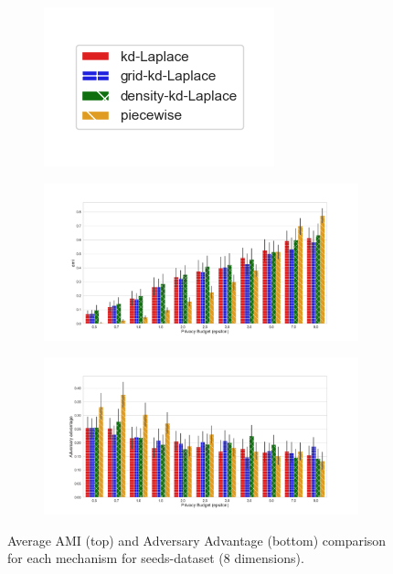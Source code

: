 \begin{figure}[H]
    \centering
    \begin{subfigure}{0.30\textwidth}
        \includegraphics[width=\textwidth]{Results/kd-laplace/ami_bar_comparison_legend.png}
    \end{subfigure}
    \begin{subfigure}{1\textwidth}
        \includegraphics[width=1\textwidth]{Results/kd-laplace/ami_seeds-dataset_comparison.png}
    \end{subfigure}
    \begin{subfigure}{1\textwidth}
        \includegraphics[width=1\textwidth]{Results/kd-laplace/shokri_mi_adv_seeds-dataset_comparison.png}
    \end{subfigure}
    \caption{Average AMI (top) and Adversary Advantage (bottom) comparison for each mechanism for seeds-dataset (8 dimensions).}
    \label{fig:utility_seeds-dataset_comparison_nd_plot}
\end{figure}
\newpage


